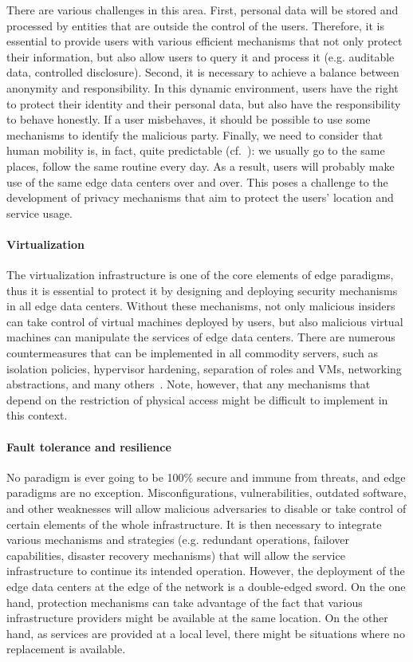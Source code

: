 \documentclass[twocolumn,preprint,3p]{elsarticle}
\begin{document}
There are various challenges in this area. First, personal data will be stored and processed by entities that are outside the control of the users. Therefore, it is essential to provide users with various efficient mechanisms that not only protect their information, but also allow users to query it and process it (e.g. auditable data, controlled disclosure). Second, it is necessary to achieve a balance between anonymity and responsibility. In this dynamic environment, users have the right to protect their identity and their personal data, but also have the responsibility to behave honestly. If a user misbehaves, it should be possible to use some mechanisms to identify the malicious party. Finally, we need to consider that human mobility is, in fact, quite predictable (cf.~\cite{Song1018}): we usually go to the same places, follow the same routine every day. As a result, users will probably make use of the same edge data centers over and over. This poses a challenge to the development of privacy mechanisms that aim to protect the users' location and service usage.

\paragraph{Virtualization} The virtualization infrastructure is one of the core elements of edge paradigms, thus it is essential to protect it by designing and deploying security mechanisms in all edge data centers. Without these mechanisms, not only malicious insiders can take control of virtual machines deployed by users, but also malicious virtual machines can manipulate the services of edge data centers. There are numerous countermeasures that can be implemented in all commodity servers, such as isolation policies, hypervisor hardening, separation of roles and VMs, networking abstractions, and many others~\cite{Pek2013}. Note, however, that any mechanisms that depend on the restriction of physical access might be difficult to implement in this context.

\paragraph{Fault tolerance and resilience} No paradigm is ever going to be 100\% secure and immune from threats, and edge paradigms are no exception. Misconfigurations, vulnerabilities, outdated software, and other weaknesses will allow malicious adversaries to disable or take control of certain elements of the whole infrastructure. It is then necessary to integrate various mechanisms and strategies (e.g. redundant operations, failover capabilities, disaster recovery mechanisms) that will allow the service infrastructure to continue its intended operation. However, the deployment of the edge data centers at the edge of the network is a double-edged sword. On the one hand, protection mechanisms can take advantage of the fact that various infrastructure providers might be available at the same location. On the other hand, as services are provided at a local level, there might be situations where no replacement is available.
\end{document}
